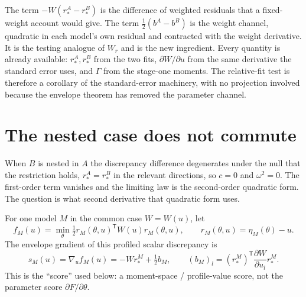 \documentclass[11pt]{article}
\newcommand{\T}{^{\mathsf{T}}}
\newcommand{\Wr}{W_{\!r}}
\newcommand{\rs}{r_{*}}
\theoremstyle{plain}
\theoremstyle{remark}
\begin{document}
The term $-W(\rs^{A}-\rs^{B})$ is the difference of weighted residuals that a
fixed-weight account would give. The term $\tfrac12(b^{A}-b^{B})$ is the weight
channel, quadratic in each model's own residual and contracted with the weight
derivative. It is the testing analogue of $\Wr$ and is the new ingredient. Every
quantity is already available: $\rs^{A},\rs^{B}$ from the two fits, $\partial
W/\partial u$ from the same derivative the standard error uses, and $\Gamma$ from
the stage-one moments. The relative-fit test is therefore a corollary of the
standard-error machinery, with no projection involved because the envelope
theorem has removed the parameter channel.

\section{The nested case does not commute}
\label{sec:nested}

When $B$ is nested in $A$ the discrepancy difference degenerates under the null
that the restriction holds, $\rs^{A}=\rs^{B}$ in the relevant directions, so
$c=0$ and $\omega^{2}=0$. The first-order term vanishes and the limiting law is
the second-order quadratic form. The question is what second derivative that
quadratic form uses.

For one model $M$ in the common case $W=W(u)$, let
\[
  f_{M}(u)=\min_{\theta}\tfrac12 r_{M}(\theta,u)\T W(u)r_{M}(\theta,u),
  \qquad r_{M}(\theta,u)=\eta_{M}(\theta)-u .
\]
The envelope gradient of this profiled scalar discrepancy is
\begin{equation}
  s_{M}(u)=\nabla_{u}f_{M}(u)
  =-W\rs^{M}+\tfrac12 b_{M},
  \qquad
  (b_{M})_{l}=(\rs^{M})\T\frac{\partial W}{\partial u_{l}}\rs^{M}.
  \label{eq:profile-score}
\end{equation}
This is the ``score'' used below: a moment-space / profile-value score, not the
parameter score $\partial F/\partial\theta$.
\end{document}

